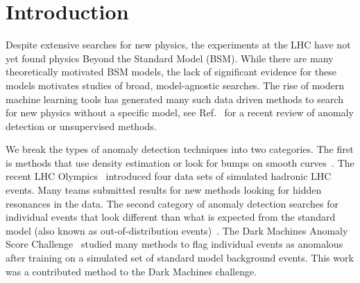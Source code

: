\documentclass[submission, Phys]{SciPost}
\begin{document}
\section{Introduction}
\label{sec:Intro}

Despite extensive searches for new physics, the experiments at the LHC have not yet found physics Beyond the Standard Model (BSM).
While there are many theoretically motivated BSM models, the lack of significant evidence for these models motivates studies of broad, model-agnostic searches.
The rise of modern machine learning tools has generated many such data driven methods to search for new physics without a specific model, see Ref.~\cite{Nachman:2020ccu} for a recent review of anomaly detection or unsupervised methods.

We break the types of anomaly detection techniques into two categories.
The first is methods that use density estimation or look for bumps on smooth curves~\cite{Collins:2018epr,DAgnolo:2018cun,DeSimone:2018efk,2018arXiv180902977C,Collins:2019jip,Dillon:2019cqt,Mullin:2019mmh,DAgnolo:2019vbw,Nachman:2020lpy,Andreassen:2020nkr,ATLAS:2020iwa,Dillon:2020quc,Benkendorfer:2020gek,Mikuni:2020qds,Stein:2020rou,Kasieczka:2021xcg,Batson:2021agz,Blance:2021gcs,Bortolato:2021zic,Collins:2021nxn,Dorigo:2021iyy,Volkovich:2021txe,Hallin:2021wme}.
The recent LHC Olympics~\cite{Kasieczka:2021xcg} introduced four data sets of simulated hadronic LHC events.
Many teams submitted results for new methods looking for hidden resonances in the data.
The second category of anomaly detection searches for individual events that look different than what is expected from the standard model (also known as out-of-distribution events)~\cite{Aguilar-Saavedra:2017rzt,Hajer:2018kqm,Heimel:2018mkt,Farina:2018fyg,Cerri:2018anq,Roy:2019jae,Blance:2019ibf,RomaoCrispim:2019tai,Amram:2020ykb,CrispimRomao:2020ejk,Knapp:2020dde,CrispimRomao:2020ucc,Cheng:2020dal,Khosa:2020qrz,Thaprasop:2020mzp,Aguilar-Saavedra:2020uhm,Pol:2020weg,vanBeekveld:2020txa,Park:2020pak,Chakravarti:2021svb,Faroughy:2020gas,Finke:2021sdf,Atkinson:2021nlt,Kahn:2021drv,Aarrestad:2021oeb,Caron:2021wmq,Govorkova:2021hqu,Gonski:2021jek,Govorkova:2021utb}.
The Dark Machines Anomaly Score Challenge~\cite{Aarrestad:2021oeb} studied many methods to flag individual events as anomalous after training on a simulated set of standard model background events.
This work was a contributed method to the Dark Machines challenge.
\end{document}

